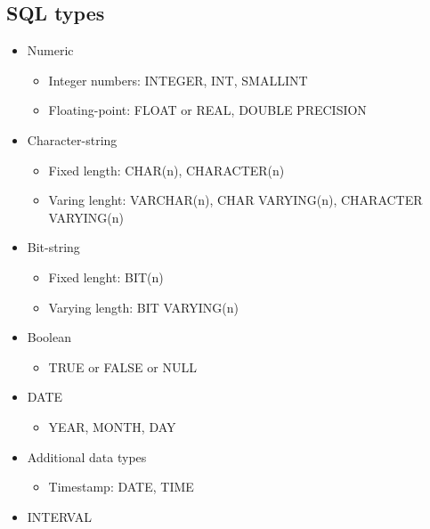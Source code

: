 \subsection{SQL types}
\begin{itemize}
    \item Numeric
    \begin{itemize}
        \item Integer numbers: INTEGER, INT, SMALLINT
        \item Floating-point: FLOAT or REAL, DOUBLE PRECISION
    \end{itemize}
    \item Character-string
    \begin{itemize}
        \item Fixed length: CHAR(n), CHARACTER(n)
        \item Varing lenght: VARCHAR(n), CHAR VARYING(n), CHARACTER VARYING(n)
    \end{itemize}
    \item Bit-string
    \begin{itemize}
        \item Fixed lenght: BIT(n)
        \item Varying length: BIT VARYING(n)
    \end{itemize}
    \item Boolean
    \begin{itemize}
        \item TRUE or FALSE or NULL
    \end{itemize}
    \item DATE
    \begin{itemize}
        \item YEAR, MONTH, DAY
    \end{itemize}
    \item Additional data types 
    \begin{itemize}
        \item Timestamp: DATE, TIME
    \end{itemize}
    \item INTERVAL
\end{itemize}

